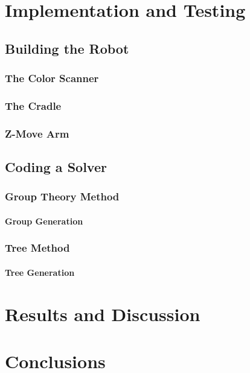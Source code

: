 \documentclass{report}
\begin{document}
    \newpage
    \chapter{Implementation and Testing}
    \section{Building the Robot}
    \subsection{The Color Scanner}
    \subsection{The Cradle}
    \subsection{Z-Move Arm}
    \section{Coding a Solver}
    \subsection{Group Theory Method}
    \subsubsection{Group Generation}
    \subsection{Tree Method}
    \subsubsection{Tree Generation}
    
    \newpage
    \chapter{Results and Discussion}
    
    \newpage
    \chapter{Conclusions}
    
    \begin{appendix}
    	\newpage  
    	\listoffigures
    	\listoftables
    	\newpage
    	
    	
    \end{appendix}
    
\end{document}
